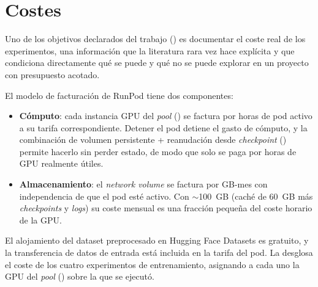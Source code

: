 \section{Costes}
\label{sec:pet-costes}

Uno de los objetivos declarados del trabajo
() es documentar el coste real de los
experimentos, una información que la literatura rara vez hace
explícita y que condiciona directamente qué se puede y qué no se
puede explorar en un proyecto con presupuesto acotado.

El modelo de facturación de RunPod tiene dos componentes:

\begin{itemize}[leftmargin=*]
    \item \textbf{Cómputo}: cada instancia GPU del \textit{pool}
    () se factura por horas de pod activo a su
    tarifa correspondiente. Detener el pod detiene el gasto de
    cómputo, y la combinación de volumen persistente + reanudación
    desde \textit{checkpoint} () permite
    hacerlo sin perder estado, de modo que solo se paga por horas de
    GPU realmente útiles.
    \item \textbf{Almacenamiento}: el \textit{network volume} se
    factura por GB-mes con independencia de que el pod esté activo.
    Con $\sim$100~GB (caché de 60~GB más \textit{checkpoints} y
    \textit{logs}) su coste mensual es una fracción pequeña del
    coste horario de la GPU.
\end{itemize}

El alojamiento del dataset preprocesado en Hugging Face Datasets es
gratuito, y la transferencia de datos de entrada está incluida en la
tarifa del pod. La  desglosa el coste de los
cuatro experimentos de entrenamiento, asignando a cada uno la GPU del
\textit{pool} () sobre la que se ejecutó.

